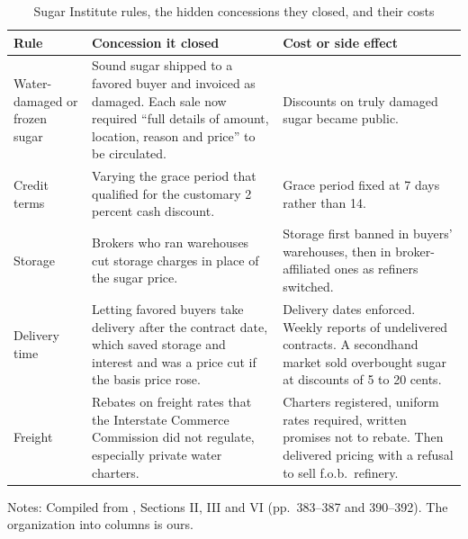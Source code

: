 \begin{table}[htbp]
\centering
\caption{Sugar Institute rules, the hidden concessions they closed, and their costs}\label{tab:13-gm-rules}
\small
\begin{tabularx}{\textwidth}{@{}>{\raggedright\arraybackslash}p{2.6cm}>{\raggedright\arraybackslash}X>{\raggedright\arraybackslash}X@{}}
\toprule
Rule & Concession it closed & Cost or side effect\\
\midrule
Water-damaged or frozen sugar & Sound sugar shipped to a favored buyer and invoiced as damaged. Each sale now
required ``full details of amount, location, reason and price'' to be circulated. & Discounts on truly damaged
sugar became public.\\
\addlinespace
Credit terms & Varying the grace period that qualified for the customary 2 percent cash discount. & Grace period
fixed at 7 days rather than 14.\\
\addlinespace
Storage & Brokers who ran warehouses cut storage charges in place of the sugar price. & Storage first banned in
buyers' warehouses, then in broker-affiliated ones as refiners switched.\\
\addlinespace
Delivery time & Letting favored buyers take delivery after the contract date, which saved storage and interest
and was a price cut if the basis price rose. & Delivery dates enforced. Weekly reports of undelivered contracts.
A secondhand market sold overbought sugar at discounts of 5 to 20 cents.\\
\addlinespace
Freight & Rebates on freight rates that the Interstate Commerce Commission did not regulate, especially private
water charters. & Charters registered, uniform rates required, written promises not to rebate. Then delivered
pricing with a refusal to sell f.o.b.\ refinery.\\
\bottomrule
\end{tabularx}

\smallskip
\begin{minipage}{0.95\textwidth}\footnotesize
Notes: Compiled from \citet{GenesoveMullin2001}, Sections II, III and VI (pp.~383--387 and 390--392). The
organization into columns is ours.
\end{minipage}
\end{table}

